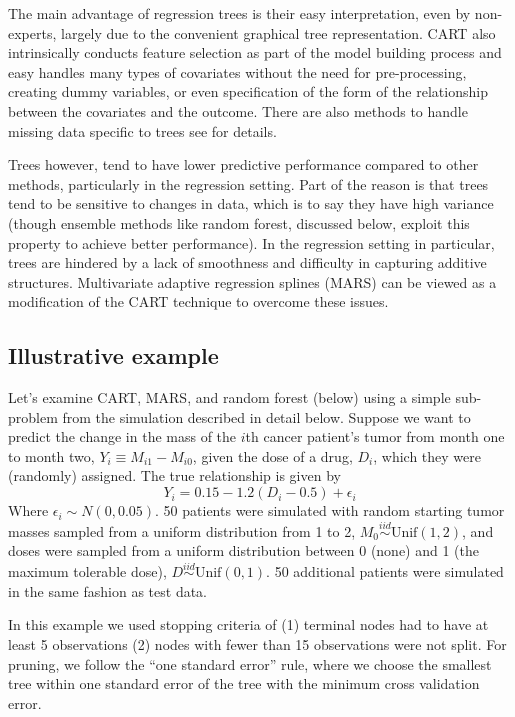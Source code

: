 \documentclass[12pt]{article}
\begin{document}
The main advantage of regression trees is their easy interpretation, even by non-experts, largely due to the convenient graphical tree representation. CART also intrinsically conducts feature selection as part of the model building process and easy handles many types of covariates without the need for pre-processing, creating dummy variables, or even specification of the form of the relationship between the covariates and the outcome. There are also methods to handle missing data specific to trees see \textcite{esl} for details.

Trees however, tend to have lower predictive performance compared to other methods, particularly in the regression setting. Part of the reason is that trees tend to be sensitive to changes in data, which is to say they have high variance (though ensemble methods like random forest, discussed below, exploit this property to achieve better performance). In the regression setting in particular, trees are hindered by a lack of smoothness and difficulty in capturing additive structures. Multivariate adaptive regression splines (MARS) can be viewed as a modification of the CART technique to overcome these issues.


\subsection{Illustrative example} %
\label{sub:example}

Let's examine CART, MARS, and random forest (below) using a simple sub-problem from the simulation described in detail below. Suppose we want to predict the change in the mass of the $i$th cancer patient's tumor from month one to month two, $Y_{i} \equiv M_{i1} - M_{i0}$, given the dose of a drug, $D_{i}$, which they were (randomly) assigned. The true relationship is given by
\begin{equation}
  Y_{i} = 0.15 - 1.2 (D_{i} - 0.5) + \epsilon_{i} 
\end{equation}
Where $\epsilon_{i} \sim N(0, 0.05)$. 50 patients were simulated with random starting tumor masses sampled from a uniform distribution from 1 to 2, $M_{0} \overset{iid}{\sim} \text{Unif}(1, 2)$, and doses were sampled from a uniform distribution between 0 (none) and 1 (the maximum tolerable dose), $D \overset{iid}{\sim} \text{Unif}(0, 1)$. 50 additional patients were simulated in the same fashion as test data. 

In this example we used stopping criteria of (1) terminal nodes had to have at least 5 observations (2) nodes with fewer than 15 observations were not split. For pruning, we follow the ``one standard error'' rule, where we choose the smallest tree within one standard error of the tree with the minimum cross validation error.
\end{document}
